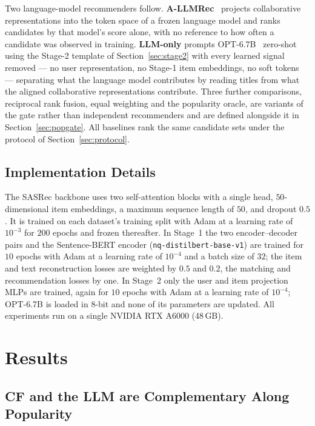 \documentclass[runningheads]{llncs}
\begin{document}
Two language-model recommenders follow. \textbf{A-LLMRec}~\cite{kim2024large}
projects collaborative representations into the token space of a frozen language
model and ranks candidates by that model's score alone, with no reference to how
often a candidate was observed in training. \textbf{LLM-only} prompts
OPT-6.7B~\cite{opt} zero-shot using the Stage-2 template of
Section~\ref{sec:stage2} with every learned signal removed --- no user
representation, no Stage-1 item embeddings, no soft tokens --- separating what the
language model contributes by reading titles from what the aligned collaborative
representations contribute. Three further comparisons, reciprocal rank fusion,
equal weighting and the popularity oracle, are variants of the gate rather than
independent recommenders and are defined alongside it in
Section~\ref{sec:popgate}. All baselines rank the same candidate sets under the
protocol of Section~\ref{sec:protocol}.


\subsection{Implementation Details}
\label{sec:impl}

The SASRec backbone uses two self-attention blocks with a single head,
$50$-dimensional item embeddings, a maximum sequence length of $50$, and dropout
$0.5$. It is trained on each dataset's training split with Adam at a learning rate
of $10^{-3}$ for $200$ epochs and frozen thereafter. In Stage~1 the two
encoder--decoder pairs and the Sentence-BERT encoder
(\texttt{nq-distilbert-base-v1}) are trained for $10$ epochs with Adam at a
learning rate of $10^{-4}$ and a batch size of $32$; the item and text
reconstruction losses are weighted by $0.5$ and $0.2$, the matching and
recommendation losses by one. In Stage~2 only the user and item projection MLPs
are trained, again for $10$ epochs with Adam at a learning rate of $10^{-4}$;
OPT-6.7B is loaded in $8$-bit and none of its parameters are updated. All
experiments run on a single NVIDIA RTX A6000 (48\,GB).


\section{Results}
\label{sec:results}

\subsection{CF and the LLM are Complementary Along Popularity}
\label{sec:results-crossover}
\end{document}
